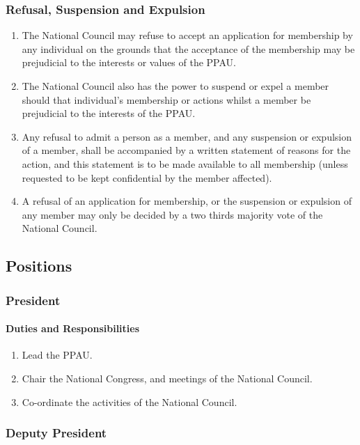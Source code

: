 \documentclass[a4paper,titlepage,8.5pt]{article}
\begin{document}
\subsubsection{Refusal, Suspension and Expulsion}

\begin{enumerate}
\item The National Council may refuse to accept an application for membership by any individual on the grounds that the acceptance of the membership may be prejudicial to the interests or values of the PPAU.
\item The National Council also has the power to suspend or expel a member should that individual’s membership or actions whilst a member be prejudicial to the interests of the PPAU.
\item Any refusal to admit a person as a member, and any suspension or expulsion of a member, shall be accompanied by a written statement of reasons for the action, and this statement is to be made available to all membership (unless requested to be kept confidential by the member affected).
\item A refusal of an application for membership, or the suspension or expulsion of any member may only be decided by a two thirds majority vote of the National Council.
\end{enumerate}

\subsection{Positions}

\subsubsection{President}

\paragraph{Duties and Responsibilities}

\begin{enumerate}
\item Lead the PPAU.
\item Chair the National Congress, and meetings of the National Council.
\item Co-ordinate the activities of the National Council.
\end{enumerate}

\subsubsection{Deputy President}
\end{document}
